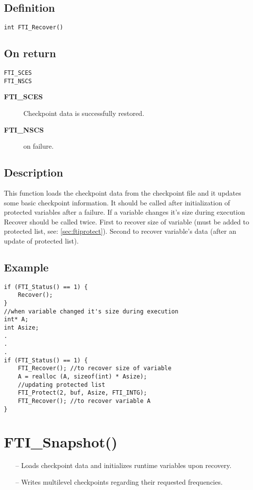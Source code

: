 \documentclass{refrep}
\begin{document}
\subsection*{Definition}
\begin{lstlisting}[frame=single]
int FTI_Recover()
\end{lstlisting}
\subsection*{On return}
\begin{lstlisting}[frame=single]
FTI_SCES
FTI_NSCS
\end{lstlisting}
\begin{description}
\item[\textbf{FTI\_SCES}] Checkpoint data is successfully restored.
\item[\textbf{FTI\_NSCS}] on failure.
\end{description}
\subsection*{Description}
This function loads the checkpoint data from the checkpoint file and it updates some basic checkpoint information. It should be called after initialization of protected variables after a failure. If a variable changes it's size during execution Recover should be called twice. First to recover size of variable (must be added to protected list, see: \ref{sec:ftiprotect}). Second to recover variable's data (after an update of protected list). 
\subsection*{Example}
\begin{center}
\begin{lstlisting}[frame=single]
if (FTI_Status() == 1) {
    Recover();
}
//when variable changed it's size during execution
int* A;
int Asize;
.
.
.
if (FTI_Status() == 1) {
    FTI_Recover(); //to recover size of variable
    A = realloc (A, sizeof(int) * Asize);
    //updating protected list
    FTI_Protect(2, buf, Asize, FTI_INTG);
    FTI_Recover(); //to recover variable A
}

\end{lstlisting}
\end{center}
\newpage
\section{\asciifamily FTI\_Snapshot()}\label{sec:ftisnapshot}
\begin{framed}
\begin{itemize}
\item[--] Loads checkpoint data and initializes runtime variables upon recovery.
\item[--] Writes multilevel checkpoints regarding their requested frequencies.
\end{itemize}
\end{framed}
\end{document}
